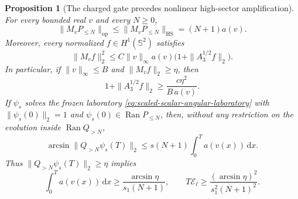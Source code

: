 \documentclass[11pt]{article}
\newcommand{\dd}{\,\mathrm d}
\DeclareMathOperator{\Ran}{Ran}
\newtheorem{proposition}[theorem]{Proposition}
\theoremstyle{definition}
\theoremstyle{remark}
\begin{document}
\begin{proposition}[The charged gate precedes nonlinear high-sector amplification]
\label{prop:scalar-preconcentration-gate}
For every bounded real $v$ and every $N\geq0$,
\begin{equation}
 \|M_vP_{\leq N}\|_{\mathrm{op}}
 \leq \|M_vP_{\leq N}\|_{\mathrm{HS}}
 =(N+1)a(v).
 \label{eq:scalar-low-band-gate}
\end{equation}
Moreover, every normalized $f\in H^1(\mathbb S^2)$ satisfies
\begin{equation}
 \|M_vf\|_2^2
 \leq C\|v\|_\infty a(v)
 \bigl(1+\|A_3^{1/2}f\|_2\bigr).
 \label{eq:scalar-preconcentration-inequality}
\end{equation}
In particular, if $\|v\|_\infty\leq B$ and $\|M_vf\|_2\geq\eta$, then
\begin{equation}
 1+\|A_3^{1/2}f\|_2\geq
 \frac{c\eta^2}{B\,a(v)}.
 \label{eq:scalar-preconcentration-toll}
\end{equation}
If $\psi_s$ solves the frozen laboratory
\eqref{eq:scaled-scalar-angular-laboratory} with
$\|\psi_s(0)\|_2=1$ and $\psi_s(0)\in\Ran P_{\leq N}$, then, without any restriction on the evolution
inside $\Ran Q_{>N}$,
\begin{equation}
 \arcsin\|Q_{>N}\psi_s(T)\|_2
 \leq s(N+1)\int_0^Ta(v(x))\dd x.
 \label{eq:scalar-band-exit-angle}
\end{equation}
Thus $\|Q_{>N}\psi_s(T)\|_2\geq\eta$ implies
\begin{equation}
 \int_0^Ta(v(x))\dd x\geq
 \frac{\arcsin\eta}{s_1(N+1)},
 \qquad
 T\mathcal E_\ell\geq
 \frac{(\arcsin\eta)^2}{s_1^2(N+1)^2}.
 \label{eq:scalar-band-exit-cost}
\end{equation}
\end{proposition}
\end{document}

